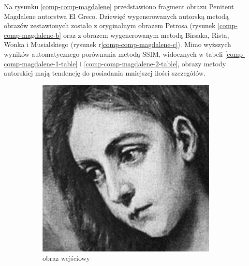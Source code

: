 \documentclass[a4paper, 12pt, polish, twoside]{extreport}
\begin{document}
	Na rysunku \ref{comp-comp-magdalene} przedstawiono fragment obrazu Penitent Magdalene autorstwa El Greco. Dziewięć wygenerowanych autorską metodą obrazów zestawionych zostało z oryginalnym obrazem Petrosa (rysunek \ref{comp-comp-magdalene-b} oraz z obrazem wygenerowanym metodą Birsaka, Rista, Wonka i Musialskiego (rysunek r\ref{comp-comp-magdalene-c}). Mimo wyższych wyników automatycznego porównania metodą SSIM, widocznych w tabeli \ref{comp-comp-magdalene-1-table} i \ref{comp-comp-magdalene-2-table}, obrazy metody autorskiej mają tendencję do posiadania mniejszej ilości szczegółów.
	\begin{figure}[H] 
    \centering
    \begin{subfigure}{0.32\textwidth}
        \centering
        \includegraphics[width = \textwidth]{img/6-comp/magdalene_original_c10_inv0.png}
        \caption{obraz wejściowy}
        \label{comp-comp-magdalene-a}
    \end{subfigure}
    \begin{subfigure}{0.32\textwidth}
        \centering

\end{subfigure}
\end{figure}
\end{document}
